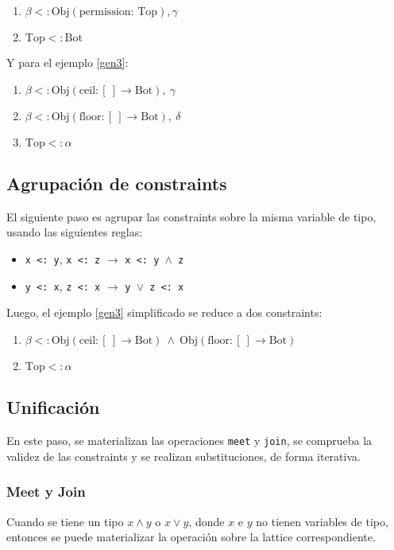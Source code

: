 \begin{enumerate}
  \item $\beta <:\text{Obj}(\text{permission: }\text{Top}), \gamma$
  \item $\text{Top} <: \text{Bot}$
\end{enumerate}

Y para el ejemplo \ref{gen3}:

\begin{enumerate}
  \item $\beta <: \text{Obj}(\text{ceil}: [\ ] \rightarrow \text{Bot}),\ \gamma$
  \item $\beta <: \text{Obj}(\text{floor}: [\ ] \rightarrow \text{Bot}),\ \delta$
  \item $\text{Top} <: \alpha$
\end{enumerate}
\subsection{Agrupación de constraints}
El siguiente paso es agrupar las constraints sobre la misma variable de tipo, usando las siguientes reglas:

\begin{itemize}
  \item \texttt{x <: y}, \texttt{x <: z} $\rightarrow$ \texttt{x <: y }$\wedge$\texttt{ z}
  \item \texttt{y <: x}, \texttt{z <: x} $\rightarrow$ \texttt{y }$\vee$\texttt{ z <: x}
\end{itemize}

Luego, el ejemplo \ref{gen3} simplificado se reduce a dos constraints:

\begin{enumerate}
  \item $\beta <: \text{Obj}(\text{ceil}: [\ ] \rightarrow \text{Bot})\ \wedge\ \text{Obj}(\text{floor}: [\ ] \rightarrow \text{Bot})$
  \item $\text{Top} <: \alpha$
\end{enumerate}


\subsection{Unificación}
En este paso, se materializan las operaciones \texttt{meet} y \texttt{join}, se comprueba la validez de las constraints y se realizan substituciones, de forma iterativa.

\subsubsection{Meet y Join}
Cuando se tiene un tipo $x \wedge y$ o $x \vee y$, donde $x$ e $y$ no tienen variables de tipo, entonces se puede materializar la operación sobre la lattice correspondiente.


